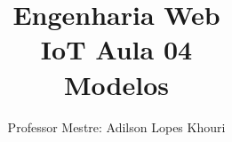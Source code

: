 \documentclass[compress, hyperref={pdfpagelayout=SinglePage}]{beamer}
\title[IoT - Aula 04]{Engenharia Web \\ IoT Aula 04 \\ Modelos}
\author{Professor Mestre: Adilson Lopes Khouri}
\begin{document}
	\begin{frame}
		\titlepage
	\end{frame}
	
	
	
	
	
	
%	
%
%	
				
	

	
	
\end{document}
